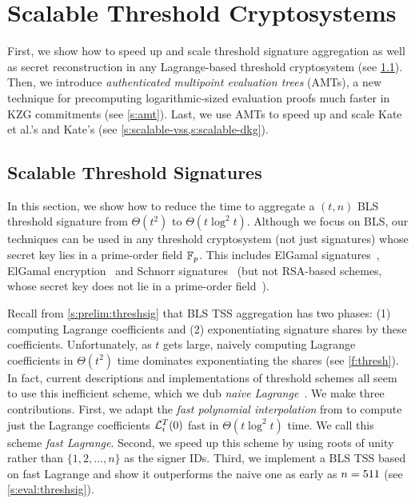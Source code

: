 \section{Scalable Threshold Cryptosystems}
First, we show how to speed up and scale threshold signature aggregation as well as secret reconstruction in any Lagrange-based threshold cryptosystem (see \cref{s:threshsig}).
Then, we introduce \textit{authenticated multipoint evaluation trees} (AMTs), a new technique for precomputing logarithmic-sized evaluation proofs much faster in KZG commitments (see \cref{s:amt}).
Last, we use AMTs to speed up and scale Kate et al.'s \evss and Kate's \ejfdkg (see \cref{s:scalable-vss,s:scalable-dkg}).

\subsection{Scalable Threshold Signatures}
\label{s:threshsig}
In this section, we show how to reduce the time to aggregate a $(t,n)$ BLS threshold signature from $\Theta(t^2)$ to $\Theta(t\log^2{t})$.
Although we focus on BLS, our techniques can be used in any threshold cryptosystem (not just signatures) whose secret key lies in a prime-order field $\mathbb{F}_p$.
This includes ElGamal signatures~\cite{Harn1994GroupOriented,Park96NewElGamal,Gennaro1996Robust}, ElGamal encryption~\cite{DesmedtFrankel1990Threshold} and Schnorr signatures~\cite{threshold-schnorr,Gennaro2003SecureApplications} (but not RSA-based schemes, whose secret key does not lie in a prime-order field~\cite{Shoup2000Practical}).

Recall from \cref{s:prelim:threshsig} that BLS TSS aggregation has two phases: (1) computing Lagrange coefficients and (2) exponentiating signature shares by these coefficients.
Unfortunately, as $t$ gets large, naively computing Lagrange coefficients in $\Theta(t^2)$ time dominates exponentiating the shares (see \cref{f:thresh}).
In fact, current descriptions and implementations of threshold schemes all seem to use this inefficient scheme, which we dub \textit{naive Lagrange}~\cite{bls-chia-impl,bls-dfinity-impl,bls-herumi-impl,bls-sbft-impl,Boldyreva2003Threshold}.
We make three contributions.
First, we adapt the \textit{fast polynomial interpolation} from \cite{moderncomputeralgebra-ch10} to compute just the Lagrange coefficients $\mathcal{L}_i^T(0)$ fast in $\Theta(t\log^2{t})$ time.
We call this scheme \textit{fast Lagrange}.
Second, we speed up this scheme by using roots of unity rather than $\{1,2,\dots, n\}$ as the signer IDs.
Third, we implement a BLS TSS based on fast Lagrange and show it outperforms the naive one as early as $n=511$ (see \cref{s:eval:threshsig}).

